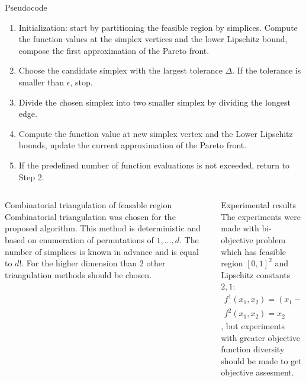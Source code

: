 \documentclass[final]{beamer}
\newlength{\onecolwid}
\newlength{\twocolwid}
\begin{document}
\begin{frame}[t]
\begin{columns}[t]
\begin{column}{\twocolwid}
      \begin{alertblock}{Pseudocode}		%
          \begin{enumerate}
                \item Initialization: start by partitioning the feasible region
                    by simplices. Compute the function values at the simplex
                    vertices and the lower Lipschitz bound, compose the first
                    approximation of the Pareto front.
                \item Choose the candidate simplex with the largest tolerance
                    $\Delta$. If the tolerance is smaller than $\epsilon$, stop.
                \item Divide the chosen simplex into two smaller simplex by
                    dividing the longest edge.
                \item Compute the function value at new simplex vertex and the
                    Lower Lipschitz bounds, update the current approximation of
                    the Pareto front.
                \item If the predefined number of function evaluations is not
                    exceeded, return to Step 2. 
          \end{enumerate}
      \end{alertblock}

      \begin{columns}[t,totalwidth=\twocolwid]
        \begin{column}{\onecolwid}
        \begin{block}{Combinatorial triangulation of feasable region}
            Combinatorial triangulation was chosen for the proposed algorithm.
            This method is deterministic and based on
            enumeration of permutations of ${1, \dots, d }$. The number of
            simplices is known in advance and is equal to $d!$. For the higher
            dimension than 2 other triangulation methods should be chosen.
        \end{block}

        \end{column}
        \begin{column}{\onecolwid}

        \begin{block}{Experimental results}
        The experiments were made with bi-objective problem which
        has feasible region $[0,1]^2$ and Lipschitz constants $2, 1$:
        \begin{equation}
        \begin{array}{c}
            f^1(x_1, x_2) = ( x_1 - 1)x_2^2 + 1\\
            f^2(x_1, x_2) = x_2
        \end{array}
        \end{equation}
        , but experiments with greater objective
        function diversity should be made to get objective assesment. 
        \end{block}


\end{column}
\end{columns}
\end{column}
\end{columns}
\end{frame}
\end{document}
